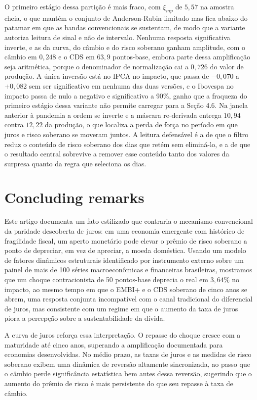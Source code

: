 \documentclass[preprint,authoryear,review,12pt]{elsarticle}
\begin{document}
O primeiro estágio dessa partição é mais fraco, com $\xi_{mp}$ de $5{,}57$ na amostra cheia, o que mantém o conjunto de Anderson-Rubin limitado mas fica abaixo do patamar em que as bandas convencionais se sustentam, de modo que a variante autoriza leitura de sinal e não de intervalo. Nenhuma resposta significativa inverte, e as da curva, do câmbio e do risco soberano ganham amplitude, com o câmbio em $0{,}248$ e o CDS em $63{,}9$ pontos-base, embora parte dessa amplificação seja aritmética, porque o denominador de normalização cai a $0{,}726$ do valor de produção. A única inversão está no IPCA no impacto, que passa de $-0{,}070$ a $+0{,}082$ sem ser significativo em nenhuma das duas versões, e o Ibovespa no impacto passa de nulo a negativo e significativo a 90\%, ganho que a fraqueza do primeiro estágio dessa variante não permite carregar para a Seção 4.6. Na janela anterior à pandemia a ordem se inverte e a máscara re-derivada entrega $10{,}94$ contra $12{,}22$ da produção, o que localiza a perda de força no período em que juros e risco soberano se moveram juntos. A leitura defensável é a de que o filtro reduz o conteúdo de risco soberano dos dias que retém sem eliminá-lo, e a de que o resultado central sobrevive a remover esse conteúdo tanto dos valores da surpresa quanto da regra que seleciona os dias.

\section{Concluding remarks}
Este artigo documenta um fato estilizado que contraria o mecanismo convencional da paridade descoberta de juros: em uma economia emergente com histórico de fragilidade fiscal, um aperto monetário pode elevar o prêmio de risco soberano a ponto de depreciar, em vez de apreciar, a moeda doméstica. Usando um modelo de fatores dinâmicos estruturais identificado por instrumento externo sobre um painel de mais de 100 séries macroeconômicas e financeiras brasileiras, mostramos que um choque contracionista de 50 pontos-base deprecia o real em $3,\!64\%$ no impacto, ao mesmo tempo em que o EMBI+ e o CDS soberano de cinco anos se abrem, uma resposta conjunta incompatível com o canal tradicional do diferencial de juros, mas consistente com um regime em que o aumento da taxa de juros piora a percepção sobre a sustentabilidade da dívida.

A curva de juros reforça essa interpretação. O repasse do choque cresce com a maturidade até cinco anos, superando a amplificação documentada para economias desenvolvidas. No médio prazo, as taxas de juros e as medidas de risco soberano exibem uma dinâmica de reversão altamente sincronizada, ao passo que o câmbio perde significância estatística bem antes dessa reversão, sugerindo que o aumento do prêmio de risco é mais persistente do que seu repasse à taxa de câmbio.
\end{document}
